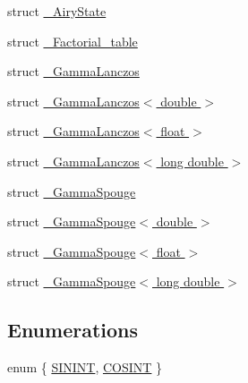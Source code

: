 \begin{DoxyCompactItemize}
\item 
struct \hyperlink{structstd_1_1____detail_1_1__AiryState}{\+\_\+\+Airy\+State}
\item 
struct \hyperlink{structstd_1_1____detail_1_1__Factorial__table}{\+\_\+\+Factorial\+\_\+table}
\item 
struct \hyperlink{structstd_1_1____detail_1_1__GammaLanczos}{\+\_\+\+Gamma\+Lanczos}
\item 
struct \hyperlink{structstd_1_1____detail_1_1__GammaLanczos_3_01double_01_4}{\+\_\+\+Gamma\+Lanczos$<$ double $>$}
\item 
struct \hyperlink{structstd_1_1____detail_1_1__GammaLanczos_3_01float_01_4}{\+\_\+\+Gamma\+Lanczos$<$ float $>$}
\item 
struct \hyperlink{structstd_1_1____detail_1_1__GammaLanczos_3_01long_01double_01_4}{\+\_\+\+Gamma\+Lanczos$<$ long double $>$}
\item 
struct \hyperlink{structstd_1_1____detail_1_1__GammaSpouge}{\+\_\+\+Gamma\+Spouge}
\item 
struct \hyperlink{structstd_1_1____detail_1_1__GammaSpouge_3_01double_01_4}{\+\_\+\+Gamma\+Spouge$<$ double $>$}
\item 
struct \hyperlink{structstd_1_1____detail_1_1__GammaSpouge_3_01float_01_4}{\+\_\+\+Gamma\+Spouge$<$ float $>$}
\item 
struct \hyperlink{structstd_1_1____detail_1_1__GammaSpouge_3_01long_01double_01_4}{\+\_\+\+Gamma\+Spouge$<$ long double $>$}
\end{DoxyCompactItemize}
\subsection*{Enumerations}
\begin{DoxyCompactItemize}
\item 
enum \{ \hyperlink{namespacestd_1_1____detail_a354c633cb3e397eae4c31776b2d67923a0fef08e2967964a1421753c5d738c838}{S\+I\+N\+I\+NT}, 
\hyperlink{namespacestd_1_1____detail_a354c633cb3e397eae4c31776b2d67923a4b5ea0190e37e477a2874e231190489e}{C\+O\+S\+I\+NT}
 \}
\end{DoxyCompactItemize}
